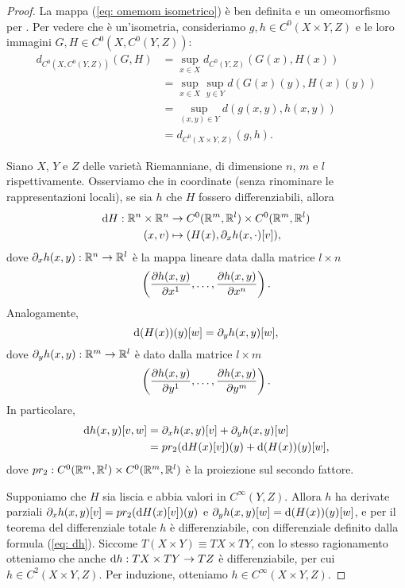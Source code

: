 \begin{proof}
	La mappa (\ref{eq: omemom isometrico}) è ben definita e un omeomorfismo per \cite[Proposition~A.13, Proposition~A.14, Proposition~A.16]{hatcher2000algebraic}. Per vedere che è un'isometria, consideriamo \(g,h \in C^0(X\times Y, Z)\) e le loro immagini \(G,H \in C^0(X,C^0(Y,Z))\):
	\begin{align*}
		d_{C^0(X,C^0(Y,Z))}(G,H) &= \sup_{x \in X} d_{C^0(Y, Z)} (G(x),H(x))\\
		&= \sup_{x \in X} \sup_{y \in Y} d(G(x)(y),H(x)(y)) \\
		&= \sup_{(x,y) \in Y} d (g(x,y),h(x,y)) \\
		&= d_{C^0(X \times Y, Z)}(g,h).
	\end{align*}
	
	Siano \(X\), \(Y\) e \(Z\) delle varietà Riemanniane, di dimensione \(n\), \(m\) e \(l\) rispettivamente. Osserviamo che in coordinate (senza rinominare le rappresentazioni locali), se sia \(h\) che \(H\) fossero differenziabili, allora
	\begin{align}\label{eq: de_xh}
		\mathrm{d} H: \mathbb{R}^n \times \mathbb{R}^n &\to C^0(\mathbb{R}^m,\mathbb{R}^l) \times C^0(\mathbb{R}^m,\mathbb{R}^l) \nonumber \\
		(x,v) & \mapsto (H(x), \partial_x h(x, \cdot )[v]),
	\end{align}
	dove \(\partial_x h(x,y): \mathbb{R}^n \to \mathbb{R}^l\) è la mappa lineare data dalla matrice \(l \times n\)
	\[
		\left( \frac{\partial h(x,y)}{\partial x^1}, \dots , \frac{\partial h(x,y)}{\partial x^n} \right).
	\] 
	Analogamente, 
	\begin{equation}\label{eq: de_yh}
		\mathrm{d} (H(x))(y)[w] = \partial_y h (x,y)[w],
	\end{equation} 
	dove \(\partial_y h(x,y): \mathbb{R}^m \to \mathbb{R}^l\) è dato dalla matrice \(l \times m\)
	\[
	\left( \frac{\partial h(x,y)}{\partial y^1}, \dots , \frac{\partial h(x,y)}{\partial y^m} \right).
	\]
	In particolare, 
	\begin{align}\label{eq: dh}
		\mathrm{d} h(x,y)[v,w] &= \partial_xh(x,y)[v]+ \partial_yh(x,y)[w] \nonumber\\
		&= pr_2(\mathrm{d} H(x)[v])(y) + \mathrm{d} (H(x))(y)[w],
	\end{align}
	dove \(pr_2: C^0(\mathbb{R}^m,\mathbb{R}^l) \times C^0(\mathbb{R}^m,\mathbb{R}^l)\) è la proiezione sul secondo fattore.
	
	Supponiamo che \(H\) sia liscia e abbia valori in \(C^\infty(Y,Z)\). Allora \(h\) ha derivate parziali \(\partial_xh(x,y)[v] = pr_2(\mathrm{d} H(x)[v])(y)\) e \(\partial_yh(x,y)[w] = \mathrm{d} (H(x))(y)[w]\), e per il teorema del differenziale totale \(h\) è differenziabile, con differenziale definito dalla formula (\ref{eq: dh}). Siccome \(T(X \times Y) \equiv TX \times TY\), con lo stesso ragionamento otteniamo che anche \(\mathrm{d} h : TX \times TY \to TZ\) è differenziabile, per cui \(h \in C^2(X \times Y, Z)\). Per induzione, otteniamo \(h \in C^\infty(X \times Y, Z)\). 
	

\end{proof}
